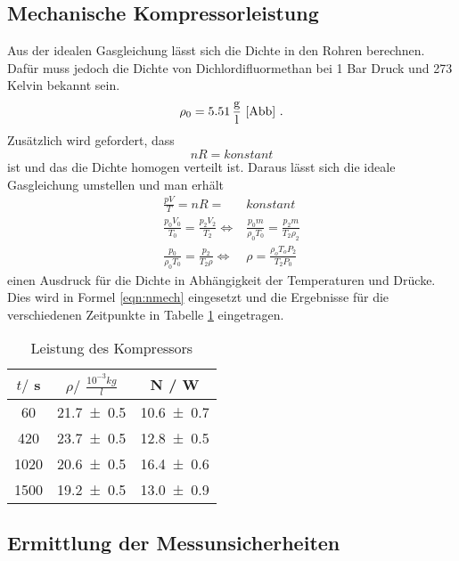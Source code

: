 \subsection{Mechanische Kompressorleistung}
Aus der idealen Gasgleichung lässt sich die Dichte in den Rohren berechnen. Dafür muss jedoch die Dichte von Dichlordifluormethan bei 1 Bar Druck und 273 Kelvin bekannt sein.
\begin{equation}
  \rho_\text{0} =  5.51 \, \frac{\text{g}}{\text{l}} \ \text{\cite{Abb}} \ .
  \label{rho}
\end{equation}
Zusätzlich wird gefordert, dass
\begin{equation}
  nR = konstant
\end{equation}
ist und das die Dichte homogen verteilt ist. Daraus lässt sich die ideale Gasgleichung umstellen und man erhält
\begin{eqnarray*}
  \frac{pV}{T} =nR =& konstant \\
  \frac{p_0 V_0}{T_0} = \frac{p_2 V_2}{T_\text{2}}  \Leftrightarrow&  \frac{p_0 m}{\rho_0 T_0} = \frac{p_2 m}{T_\text{2} \rho_2} \\
  \frac{p_0}{\rho_0 T_0} = \frac{p_2}{T_\text{2} \rho} \Leftrightarrow& \rho = \frac{\rho_o T_o P_2}{T_\text{2} P_0}
  \label{eqn:rho}
\end{eqnarray*}
einen Ausdruck für die Dichte in Abhängigkeit der Temperaturen und Drücke. Dies wird in Formel \ref{eqn:nmech} eingesetzt und die Ergebnisse für die verschiedenen Zeitpunkte in Tabelle \ref{tab:LdK} eingetragen.
\begin{table}
  \centering
  \begin{tabular}{c c c}
    \toprule
    $t /$ s & $\rho /$ $\frac{10^{-3}kg}{l}$ & N / W \\
    \midrule
    60   & \num{21.7 +- 0.5} & \num{10.6 +- 0.7} \\
    420  & \num{23.7 +- 0.5} & \num{12.8 +- 0.5} \\
    1020 & \num{20.6 +- 0.5} & \num{16.4 +- 0.6} \\
    1500 & \num{19.2 +- 0.5} & \num{13.0 +- 0.9} \\
    \bottomrule
  \end{tabular}
  \caption{Leistung des Kompressors}
  \label{tab:LdK}
\end{table}

\subsection{Ermittlung der Messunsicherheiten}

